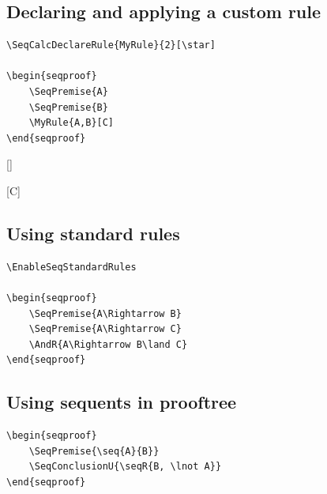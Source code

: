 \documentclass[a4paper,1pt]{article}
\begin{document}
\subsection{Declaring and applying a custom rule}
\begin{tcolorbox}[seqexample,title={Custom rule}]
\begin{lstlisting}
\SeqCalcDeclareRule{MyRule}{2}[\star]

\begin{seqproof}
    \SeqPremise{A}
    \SeqPremise{B}
    \MyRule{A,B}[C]
\end{seqproof}
\end{lstlisting}
\tcblower
{}[\star]
\begin{seqproof}
    [C]
\end{seqproof}
\end{tcolorbox}

\subsection{Using standard rules}
\begin{tcolorbox}[seqexample,title={Standard rule: AndR}]
\begin{lstlisting}
\EnableSeqStandardRules

\begin{seqproof}
    \SeqPremise{A\Rightarrow B}
    \SeqPremise{A\Rightarrow C}
    \AndR{A\Rightarrow B\land C}
\end{seqproof}
\end{lstlisting}
\tcblower
\EnableSeqStandardRules
\begin{seqproof}
\end{seqproof}
\end{tcolorbox}

\subsection{Using sequents in prooftree}
\begin{tcolorbox}[seqexample,title={Sequents in prooftree}]
\begin{lstlisting}
\begin{seqproof}
    \SeqPremise{\seq{A}{B}}
    \SeqConclusionU{\seqR{B, \lnot A}}
\end{seqproof}
\end{lstlisting}
\tcblower
\begin{seqproof}
\end{seqproof}
\end{tcolorbox}
\end{document}
